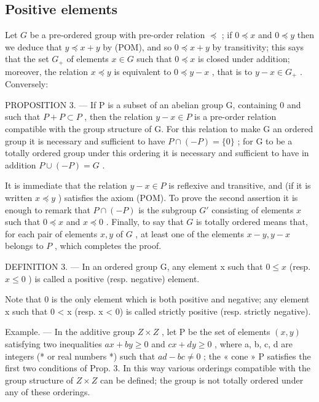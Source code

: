\subsection{Positive elements}

Let \(G\) be a pre-ordered group with pre-order relation \(\preccurlyeq\) ; if \(0 \preccurlyeq x\) and \(0 \preccurlyeq y\) then we deduce that \(y \preccurlyeq x + y\) by (POM), and so \(0 \preccurlyeq x + y\) by transitivity; this says that the set \(G_{+}\) of elements \(x \in G\) such that \(0 \preccurlyeq x\) is closed under addition; moreover, the relation \(x \preccurlyeq y\) is equivalent to \(0 \preccurlyeq y - x\) , that is to \(y - x \in G_{+}\) . Conversely:

PROPOSITION 3. --- If P is a subset of an abelian group G, containing 0 and such that \(P + P \subset P\) , then the relation \(y - x \in P\) is a pre-order relation compatible with the group structure of G. For this relation to make G an ordered group it is necessary and sufficient to have \(P \cap (-P) = \{0\}\) ; for G to be a totally ordered group under this ordering it is necessary and sufficient to have in addition \(P \cup (-P) = G\) .

It is immediate that the relation \(y - x \in P\) is reflexive and transitive, and (if it is written \(x \preccurlyeq y\) ) satisfies the axiom (POM). To prove the second assertion it is enough to remark that \(P \cap (-P)\) is the subgroup \(G'\) consisting of elements \(x\) such that \(0 \preccurlyeq x\) and \(x \preccurlyeq 0\) . Finally, to say that \(G\) is totally ordered means that, for each pair of elements \(x, y\) of \(G\) , at least one of the elements \(x - y, y - x\) belongs to \(P\) , which completes the proof.

DEFINITION 3. --- In an ordered group G, any element x such that \(0 \leqslant x\) (resp. \(x \leqslant 0\) ) is called a positive (resp. negative) element.

Note that 0 is the only element which is both positive and negative; any element x such that 0 \textless{} x (resp. x \textless{} 0) is called strictly positive (resp. strictly negative).

Example. --- In the additive group \(Z \times Z\) , let P be the set of elements \((x, y)\) satisfying two inequalities \(ax + by \geqslant 0\) and \(cx + dy \geqslant 0\) , where a, b, c, d are integers (* or real numbers *) such that \(ad - bc \neq 0\) ; the « cone » P satisfies the first two conditions of Prop. 3. In this way various orderings compatible with the group structure of \(Z \times Z\) can be defined; the group is not totally ordered under any of these orderings.

